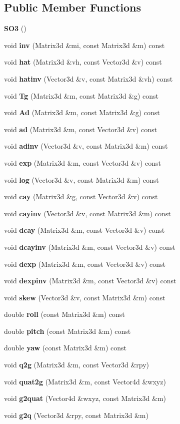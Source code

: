 \subsection*{\-Public \-Member \-Functions}
\begin{DoxyCompactItemize}
\item 
{\bf \-S\-O3} ()
\item 
void {\bf inv} (\-Matrix3d \&mi, const \-Matrix3d \&m) const 
\item 
void {\bf hat} (\-Matrix3d \&vh, const \-Vector3d \&v) const 
\item 
void {\bf hatinv} (\-Vector3d \&v, const \-Matrix3d \&vh) const 
\item 
void {\bf \-Tg} (\-Matrix3d \&m, const \-Matrix3d \&g) const 
\item 
void {\bf \-Ad} (\-Matrix3d \&m, const \-Matrix3d \&g) const 
\item 
void {\bf ad} (\-Matrix3d \&m, const \-Vector3d \&v) const 
\item 
void {\bf adinv} (\-Vector3d \&v, const \-Matrix3d \&m) const 
\item 
void {\bf exp} (\-Matrix3d \&m, const \-Vector3d \&v) const 
\item 
void {\bf log} (\-Vector3d \&v, const \-Matrix3d \&m) const 
\item 
void {\bf cay} (\-Matrix3d \&g, const \-Vector3d \&v) const 
\item 
void {\bf cayinv} (\-Vector3d \&v, const \-Matrix3d \&m) const 
\item 
void {\bf dcay} (\-Matrix3d \&m, const \-Vector3d \&v) const 
\item 
void {\bf dcayinv} (\-Matrix3d \&m, const \-Vector3d \&v) const 
\item 
void {\bf dexp} (\-Matrix3d \&m, const \-Vector3d \&v) const 
\item 
void {\bf dexpinv} (\-Matrix3d \&m, const \-Vector3d \&v) const 
\item 
void {\bf skew} (\-Vector3d \&v, const \-Matrix3d \&m) const 
\item 
double {\bf roll} (const \-Matrix3d \&m) const 
\item 
double {\bf pitch} (const \-Matrix3d \&m) const 
\item 
double {\bf yaw} (const \-Matrix3d \&m) const 
\item 
void {\bf q2g} (\-Matrix3d \&m, const \-Vector3d \&rpy)
\item 
void {\bf quat2g} (\-Matrix3d \&m, const \-Vector4d \&wxyz)
\item 
void {\bf g2quat} (\-Vector4d \&wxyz, const \-Matrix3d \&m)
\item 
void {\bf g2q} (\-Vector3d \&rpy, const \-Matrix3d \&m)
\end{DoxyCompactItemize}
